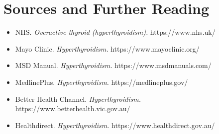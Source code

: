 \section*{Sources and Further Reading}
\begin{itemize}
    \item NHS. \textit{Overactive thyroid (hyperthyroidism).} https://www.nhs.uk/
    \item Mayo Clinic. \textit{Hyperthyroidism.} https://www.mayoclinic.org/
    \item MSD Manual. \textit{Hyperthyroidism.} https://www.msdmanuals.com/
    \item MedlinePlus. \textit{Hyperthyroidism.} https://medlineplus.gov/
    \item Better Health Channel. \textit{Hyperthyroidism.} https://www.betterhealth.vic.gov.au/
    \item Healthdirect. \textit{Hyperthyroidism.} https://www.healthdirect.gov.au/
\end{itemize}
